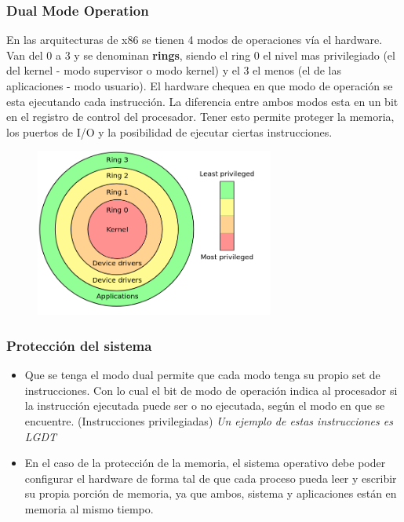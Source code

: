 \documentclass[titlepage,a4paper]{article}
\begin{document}
\subsubsection*{Dual Mode Operation}
En las arquitecturas de x86 se tienen 4 modos de operaciones vía el hardware. Van del 0 a 3 y se denominan \textbf{rings}, siendo el ring 0 el nivel mas privilegiado (el del kernel - modo supervisor o modo kernel) y el 3 el menos (el de las aplicaciones - modo usuario). El hardware chequea en que modo de operación se esta ejecutando cada instrucción. La diferencia entre ambos modos esta en un bit en el registro de control del procesador. Tener esto permite proteger la memoria, los puertos de I/O y la posibilidad de ejecutar ciertas instrucciones.


\begin{figure}[!htb]
    \centering
    \includegraphics[width=0.7\textwidth]{ImagenesApunte/rings.png}
\end{figure}


\subsubsection*{Protección del sistema}

\begin{itemize}
    \item Que se tenga el modo dual permite que cada modo tenga su propio set de instrucciones. Con lo cual el bit de modo de operación indica al procesador si la instrucción ejecutada puede ser o no ejecutada, según el modo en que se encuentre. (Instrucciones privilegiadas) \textit{Un ejemplo de estas instrucciones es LGDT}
    
    \item En el caso de la protección de la memoria, el sistema operativo debe poder configurar el hardware de forma tal de que cada proceso pueda leer y escribir su propia porción de memoria, ya que ambos, sistema y aplicaciones están en memoria al mismo tiempo.
\end{itemize}
\end{document}
